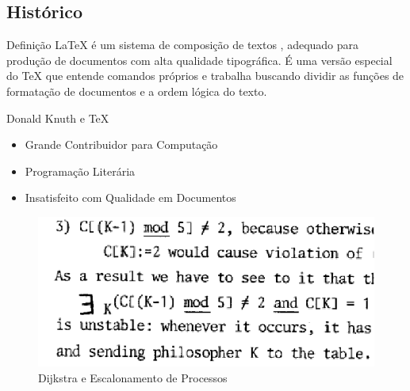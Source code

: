 \documentclass[hyperref={pdfpagelabels=false}]{beamer}
\begin{document}
\subsection{Histórico}

\begin{frame}{Definição}
    \LaTeX{} é um sistema de composição de textos \cite{oetiker2008}, adequado
    para produção de documentos com alta qualidade tipográfica. É uma versão
    especial do \TeX{} que entende comandos próprios \cite{lamport1994} e
    trabalha buscando dividir as funções de formatação de documentos e a ordem
    lógica do texto.
\end{frame}

\begin{frame}{Donald Knuth e \TeX{}}
    \begin{itemize}
        \item Grande Contribuidor para Computação
        \item Programação Literária
        \item Insatisfeito com Qualidade em Documentos
    \end{itemize}
    \pause{}
    \begin{figure}
        \includegraphics[scale=0.4]{images/dijkstra}
        \caption{Dijkstra e Escalonamento de Processos}
    \end{figure}
\end{frame}
\end{document}

